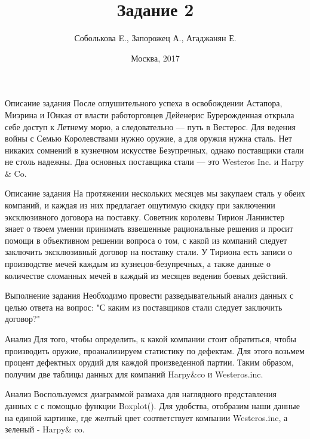 \documentclass{beamer}
\title{Задание 2}
\author{Соболькова E., Запорожец А., Агаджанян Е.}
\institute{МГУ имени М. В. Ломоносова}
\date{Москва, 2017}
\begin{document}
\maketitle

\begin{frame}{Описание задания} 
После оглушительного успеха в освобождении Астапора, Миэрина и Юнкая от власти работорговцев Дейенерис Бурерожденная открыла себе доступ к Летнему морю, а следовательно — путь в Вестерос. 
Для ведения войны с Семью Королевствами нужно оружие, а для оружия нужна сталь. Нет никаких сомнений в кузнечном искусстве Безупречных, однако поставщики стали не столь надежны. 
Два основных поставщика стали — это Westeros Inc. и Harpy \& Co. 
\end{frame} 

\begin{frame}{Описание задания} 
На протяжении нескольких месяцев мы закупаем сталь у обеих компаний, и каждая из них предлагает ощутимую скидку при заключении эксклюзивного договора на поставку.
Советник королевы Тирион Ланнистер знает о твоем умении принимать взвешенные рациональные решения и просит помощи в объективном решении вопроса о том, с какой из компаний следует заключить эксклюзивный договор на поставку стали. 
У Тириона есть записи о производстве мечей каждым из кузнецов-безупречных, а также данные о количестве сломанных мечей в каждый из месяцев ведения боевых действий. 
\end{frame} 

\begin{frame}{Выполнение задания} 
Необходимо провести разведывательный анализ данных с целью ответа на вопрос: "С каким из поставщиков стали следует заключить договор?"
\end{frame}

\begin{frame}{Анализ}
Для того, чтобы определить, к какой компании стоит обратиться, чтобы производить оружие, проанализируем статистику по дефектам. Для этого возьмем процент дефектных орудий для каждой произведенной партии. Таким образом, получим две таблицы данных для компаний Harpy\&co и Westeros.inc. 
\end{frame}

\begin{frame}{Анализ}
Воспользуемся диаграммой размаха для наглядного представления данных с с помощью функции Boxplot().
Для удобства, отобразим наши данные на единой картинке, где желтый цвет соответствует компании Westeros.inc, а зеленый - Harpy\& co.
\end{frame}
\end{document}

